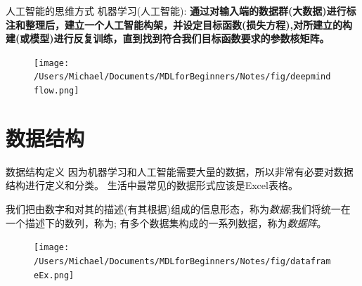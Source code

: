 \documentclass[handout]{beamer}
\begin{document}
%

\begin{frame}{人工智能的思维方式}
机器学习(人工智能): \textbf{通过对输入端的数据群(大数据)进行标注和整理后，建立一个人工智能构架，并设定目标函数(损失方程),对所建立的构建(或模型)进行反复训练，直到找到符合我们目标函数要求的参数核矩阵。}
\begin{figure}[H]
	\centering
	\texttt{[image: /Users/Michael/Documents/MDLforBeginners/Notes/fig/deepmindflow.png]}
\end{figure}
\end{frame}


\section{数据结构}



\begin{frame}{数据结构定义}
	因为机器学习和人工智能需要大量的数据，所以非常有必要对数据结构进行定义和分类。 生活中最常见的数据形式应该是Excel表格。
	\begin{definition}
	我们把由数字和对其的描述(有其根据)组成的信息形态，称为\textit{数据};我们将统一在一个描述下的数列，称为; 有多个数据集构成的一系列数据，称为\textit{数据阵}。
\end{definition}
\begin{figure}[H]
	\centering
	\texttt{[image: /Users/Michael/Documents/MDLforBeginners/Notes/fig/dataframeEx.png]}
\end{figure}
\end{frame}
\end{document}

